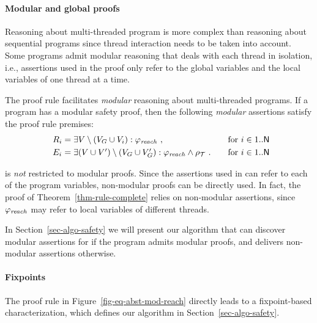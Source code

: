 \paragraph{Modular and  global proofs}

Reasoning about multi-threaded program is more complex than reasoning
about sequential programs since thread interaction needs to be taken
into account.
Some programs admit modular reasoning that deals with each thread in
isolation, i.e., assertions used in the proof only refer to the global
variables and the local variables of one thread at a time.

The proof rule \ProofRule facilitates \emph{modular} reasoning about
multi-threaded programs. 
If a program has a modular safety proof, then the following
\emph{modular} assertions satisfy the proof rule premises:
%
\begin{equation*}
  \begin{array}[t]{l@{\defeq}l@{\qquad}c@{}}
    \Reach_i & \exists \Vars\setminus (\GlobVars \cup \LocVarsOf{i}) :
    \SymbReach\ , & \text{for }
    i \in \ThreadIds\\[\jot]
    \Env_i & \exists (\Vars\cup \Vars')\setminus (\GlobVars \cup
    \GlobVars') : \SymbReach\land \relProg\ . & \text{for }
    i  \in \ThreadIds
  \end{array}
\end{equation*}
% 

\ProofRule is \emph{not} restricted to modular proofs. 
Since the assertions used in \ProofRule can refer to each of the program
variables, non-modular proofs can be directly used.
In fact, the proof of Theorem~\ref{thm-rule-complete} relies on
non-modular assertions, since $\varphi_\mathit{reach}$ may refer to local
variables of different threads.

In Section~\ref{sec-algo-safety} we will present our algorithm that
can discover modular assertions for \ProofRule if the program admits
modular proofs, and delivers non-modular assertions otherwise.




\paragraph{Fixpoints}

The proof rule \ProofRule in Figure~\ref{fig-eq-abst-mod-reach}
directly leads to a fixpoint-based characterization, which defines our
algorithm in Section~\ref{sec-algo-safety}.

